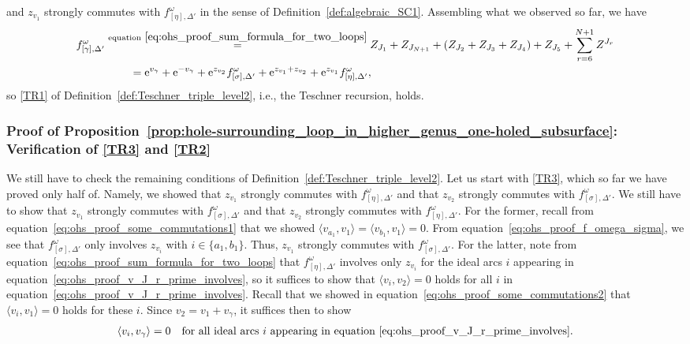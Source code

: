 \documentclass[10pt,a4paper]{amsart}
\numberwithin{equation}{section}
\theoremstyle{definition}
\begin{document}
and $z_{v_1}$ strongly commutes with $f^\omega_{[\eta],\Delta'}$ in the sense of Definition~\ref{def:algebraic_SC1}.
Assembling what we observed so far, we have
\begin{align*}
f^\omega_{[\gamma],\Delta'}
 & \stackrel{{\rm equation}~\eqref{eq:ohs_proof_sum_formula_for_two_loops}}{=} Z_{J_1} + Z_{J_{N+1}} + (Z_{J_2}+Z_{J_3}+Z_{J_4}) + Z_{J_5} + \sum_{r=6}^{N+1} Z^{J_r} \\
 & \hspace{7.9mm} = {\rm e}^{v_\gamma} + {\rm e}^{-v_\gamma} + {\rm e}^{z_{v_2}} f^\omega_{[\sigma],\Delta'} + {\rm e}^{z_{v_1} + z_{v_2}} + {\rm e}^{z_{v_1}} f^\omega_{[\eta],\Delta'},
\end{align*}
so \ref{TR1} of Definition~\ref{def:Teschner_triple_level2}, i.e., the Teschner recursion, holds.
\subsubsection{Proof of Proposition~\ref{prop:hole-surrounding_loop_in_higher_genus_one-holed_subsurface}: Verification of \ref{TR3} and \ref{TR2}}
We still have to check the remaining conditions of Definition~\ref{def:Teschner_triple_level2}. Let us start with \ref{TR3}, which so far we have proved only half of. Namely, we showed that $z_{v_1}$ strongly commutes with $f^\omega_{[\eta],\Delta'}$ and that $z_{v_2}$ strongly commutes with $f^\omega_{[\sigma],\Delta'}$. We still have to show that $z_{v_1}$ strongly commutes with $f^\omega_{[\sigma],\Delta'}$ and that $z_{v_2}$ strongly commutes with $f^\omega_{[\eta],\Delta'}$. For the former, recall from equation~\eqref{eq:ohs_proof_some_commutations1} that we showed $\langle v_{a_1},v_1 \rangle =\langle v_{b_1},v_1\rangle=0$. From equation~\eqref{eq:ohs_proof_f_omega_sigma}, we see that $f^\omega_{[\sigma],\Delta'}$ only involves $z_{v_i}$ with $i \in \{a_1,b_1\}$. Thus, $z_{v_1}$ strongly commutes with $f^\omega_{[\sigma],\Delta'}$. For the latter, note from equation~\eqref{eq:ohs_proof_sum_formula_for_two_loops} that $f^\omega_{[\eta],\Delta'}$ involves only $z_{v_i}$ for the ideal arcs $i$ appearing in equation~\eqref{eq:ohs_proof_v_J_r_prime_involves}, so it suffices to show that $\langle v_i, v_2\rangle=0$ holds for all $i$ in equation~\eqref{eq:ohs_proof_v_J_r_prime_involves}. Recall that we showed in equation~\eqref{eq:ohs_proof_some_commutations2} that $\langle v_i, v_1\rangle=0$ holds for these $i$. Since $v_2 = v_1 +v_\gamma$, it suffices then to show
\begin{align}
\label{eq:ohs_proof_some_commutations3}
\langle v_i, v_\gamma\rangle = 0 \quad \text{for all ideal arcs $i$ appearing in equation~\eqref{eq:ohs_proof_v_J_r_prime_involves}.}
\end{align}
\end{document}
